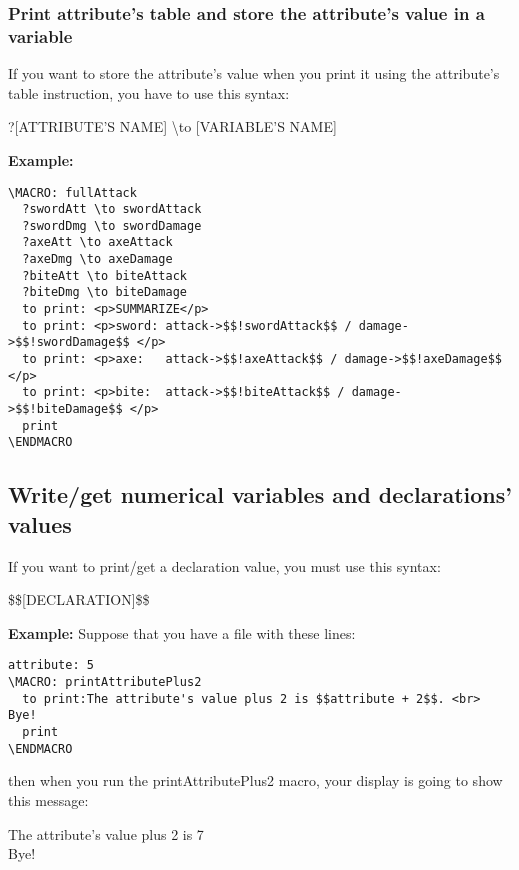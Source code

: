 \documentclass[11pt,a4paper,openright,oneside]{book}
\newenvironment{ex}
{
  \setlength{\parindent}{0cm}
  \large \textbf{Example:} \normalsize 
}
{}
\begin{document}
\subsubsection{Print attribute's table and store the attribute's value in a variable}
If you want to store the attribute's value when you print it using the attribute's table instruction, you have to use this syntax:
\begin{center} \textsf{?\textsc{\scriptsize[ATTRIBUTE'S NAME]} \textbackslash to \textsc{\scriptsize[VARIABLE'S NAME]} } \end{center}

\begin{ex}
  \begin{lstlisting}
\MACRO: fullAttack
  ?swordAtt \to swordAttack
  ?swordDmg \to swordDamage
  ?axeAtt \to axeAttack
  ?axeDmg \to axeDamage
  ?biteAtt \to biteAttack
  ?biteDmg \to biteDamage
  to print: <p>SUMMARIZE</p>
  to print: <p>sword: attack->$$!swordAttack$$ / damage->$$!swordDamage$$ </p>
  to print: <p>axe:   attack->$$!axeAttack$$ / damage->$$!axeDamage$$ </p>
  to print: <p>bite:  attack->$$!biteAttack$$ / damage->$$!biteDamage$$ </p>
  print
\ENDMACRO
  \end{lstlisting} 
\end{ex}


\subsection{Write/get numerical variables and declarations' values}

If you want to print/get a declaration value, you must use this syntax:
\begin{center} \textsf{\$\$\textsc{\scriptsize[DECLARATION]}\$\$} \end{center}

\begin{ex} Suppose that you have a file with these lines:
  \begin{lstlisting}
attribute: 5
\MACRO: printAttributePlus2
  to print:The attribute's value plus 2 is $$attribute + 2$$. <br> Bye!
  print
\ENDMACRO
  \end{lstlisting} 
then when you run the \textsf{printAttributePlus2} macro, your display is going to show this message:
\vspace{5px}

\textsf{The attribute's value plus 2 is 7 \\
Bye!}
\end{ex}
\end{document}
